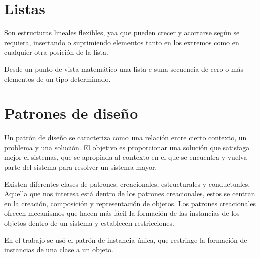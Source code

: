 \section{Listas}\label{listas}
Son estructuras lineales flexibles, yaa que pueden crecer y acortarse según se requiera, insertando o suprimiendo elementos tanto en los extremos como en cualquier otra posición de la lista.

Desde un punto de vista matemático una lista e suna secuencia de cero o más elementos de un tipo determinado.
\section{Patrones de diseño}\label{patronesDiseno}
Un patrón de diseño se caracteriza como una relación entre cierto contexto, un problema y una solución. El objetivo es proporcionar una solución que satisfaga mejor el sistemas, que se apropiada al contexto en el que se encuentra y vuelva parte del sistema para resolver un sistema mayor.

Existen diferentes clases de patrones; creacionales, estructurales y conductuales.
Aquella que nos interesa está dentro de los patrones creacionales, estos se centran en la creación, composición y representación de objetos. Los patrones creacionales ofrecen mecanismos que hacen más fácil la formación de las instancias de los objetos dentro de un sistema y establecen restricciones.

En el trabajo se usó el patrón de instancia única, que restringe la formación de instancias de una clase a un objeto.